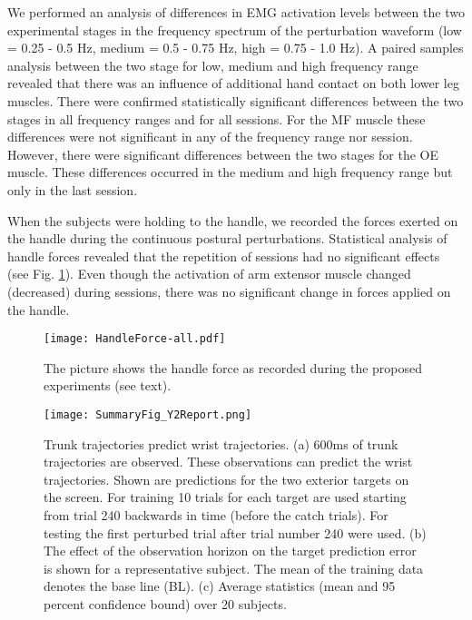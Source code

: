 We performed an analysis of differences in EMG activation levels between the two experimental stages in the frequency spectrum of the perturbation waveform (low = 0.25 - 0.5 Hz, medium = 0.5 - 0.75 Hz, high = 0.75 - 1.0 Hz). A paired samples analysis between the two stage for low, medium and high frequency range revealed that there was an influence of additional hand contact on both lower leg muscles. There were confirmed statistically significant differences between the two stages in all frequency ranges and for all sessions. For the MF muscle these differences were not significant in any of the frequency range nor session. However, there were significant differences between the two stages for the OE muscle. These differences occurred in the medium and high frequency range but only in the last session.

When the subjects were holding to the handle, we recorded the forces exerted on the handle during the continuous postural perturbations. Statistical analysis of handle forces revealed that the repetition of sessions had no significant effects (see Fig. \ref{fig:HandleForces}). Even though the activation of arm extensor muscle changed (decreased) during sessions, there was no significant change in forces applied on the handle.

\begin{figure}[!t]
	\begin{center}
		\texttt{[image: HandleForce-all.pdf]}
		\caption{The picture shows the handle force as recorded during the proposed experiments (see text).}
		\label{fig:HandleForces}
	\end{center}
\end{figure}


\begin{figure}
\centering
\texttt{[image: SummaryFig\_Y2Report.png]}
\caption{Trunk trajectories predict wrist trajectories. (a) 600ms of trunk trajectories are observed. These observations can predict the wrist trajectories. Shown are predictions for the two exterior targets on the screen. For training 10 trials for each target are used starting from trial 240 backwards in time (before the catch trials). For testing the first perturbed trial after trial number 240 were used. (b) The effect of the observation horizon on the target prediction error is shown for a representative subject. The mean of the training data denotes the base line (BL). (c) Average statistics (mean and 95 percent confidence bound) over 20 subjects.
}
\label{fig:HumanProMPsPrediction}
\end{figure}

